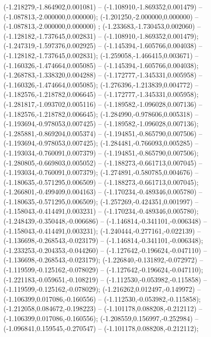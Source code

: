  (-1.218279,-1.864902,0.001081) -- (-1.108910,-1.869352,0.001479) -- (-1.087813,-2.000000,0.000000);
 (-1.201250,-2.000000,0.000000) -- (-1.087813,-2.000000,0.000000) ;
 (-1.233683,-1.730453,0.002060) -- (-1.128182,-1.737645,0.002831) -- (-1.108910,-1.869352,0.001479);
 (-1.247319,-1.597376,0.002925) -- (-1.145394,-1.605766,0.004038) -- (-1.128182,-1.737645,0.002831);
 (-1.259058,-1.466415,0.003671) -- (-1.160326,-1.474664,0.005085) -- (-1.145394,-1.605766,0.004038);
 (-1.268783,-1.338320,0.004288) -- (-1.172777,-1.345331,0.005958) -- (-1.160326,-1.474664,0.005085);
 (-1.276396,-1.213839,0.004772) -- (-1.182576,-1.218782,0.006645) -- (-1.172777,-1.345331,0.005958);
 (-1.281817,-1.093702,0.005116) -- (-1.189582,-1.096028,0.007136) -- (-1.182576,-1.218782,0.006645);
 (-1.284990,-0.978606,0.005318) -- (-1.193694,-0.978053,0.007425) -- (-1.189582,-1.096028,0.007136);
 (-1.285881,-0.869204,0.005374) -- (-1.194851,-0.865790,0.007506) -- (-1.193694,-0.978053,0.007425);
 (-1.284481,-0.766093,0.005285) -- (-1.193034,-0.760091,0.007379) -- (-1.194851,-0.865790,0.007506);
 (-1.280805,-0.669803,0.005052) -- (-1.188273,-0.661713,0.007045) -- (-1.193034,-0.760091,0.007379);
 (-1.274891,-0.580785,0.004676) -- (-1.180635,-0.571295,0.006509) -- (-1.188273,-0.661713,0.007045);
 (-1.266801,-0.499409,0.004163) -- (-1.170234,-0.489346,0.005780) -- (-1.180635,-0.571295,0.006509);
 (-1.257269,-0.424351,0.001997) -- (-1.158043,-0.414491,0.003231) -- (-1.170234,-0.489346,0.005780);
 (-1.248439,-0.350448,-0.006686) -- (-1.146814,-0.341101,-0.006348) -- (-1.158043,-0.414491,0.003231);
 (-1.240444,-0.277161,-0.022139) -- (-1.136698,-0.268543,-0.023179) -- (-1.146814,-0.341101,-0.006348);
 (-1.233253,-0.204353,-0.044260) -- (-1.127642,-0.196624,-0.047110) -- (-1.136698,-0.268543,-0.023179);
 (-1.226840,-0.131892,-0.072972) -- (-1.119599,-0.125162,-0.078029) -- (-1.127642,-0.196624,-0.047110);
 (-1.221183,-0.059651,-0.108219) -- (-1.112530,-0.053982,-0.115858) -- (-1.119599,-0.125162,-0.078029);
 (-1.216262,0.012497,-0.149972) -- (-1.106399,0.017086,-0.160556) -- (-1.112530,-0.053982,-0.115858);
 (-1.212058,0.084672,-0.198223) -- (-1.101178,0.088208,-0.212112) -- (-1.106399,0.017086,-0.160556);
 (-1.208559,0.156997,-0.252984) -- (-1.096841,0.159545,-0.270547) -- (-1.101178,0.088208,-0.212112);
